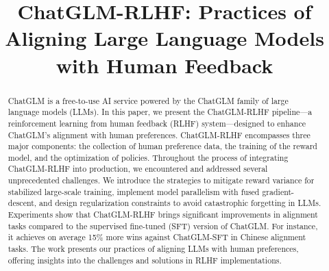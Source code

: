 \title{ChatGLM-RLHF: Practices of Aligning Large Language Models with Human Feedback}



\maketitle
\renewcommand{\thefootnote}{\fnsymbol{footnote}}
\renewcommand{\thefootnote}{\arabic{footnote}}

\begin{abstract}

ChatGLM is a free-to-use AI service powered by the ChatGLM family of large language models (LLMs). 
In this paper, we present the ChatGLM-RLHF pipeline---a reinforcement learning from human feedback (RLHF) system---designed to enhance ChatGLM's alignment with human preferences. 
ChatGLM-RLHF encompasses three major components: the collection of human preference data, the training of the reward model, and the optimization of policies. 
Throughout the process of integrating ChatGLM-RLHF into production, we encountered and addressed several unprecedented challenges. 
We introduce the strategies to mitigate reward variance for stabilized large-scale training, implement model parallelism with fused gradient-descent, and design regularization constraints to avoid catastrophic forgetting in LLMs. 
Experiments show that  ChatGLM-RLHF brings significant improvements in alignment tasks compared to the supervised fine-tuned (SFT) version of ChatGLM. 
For instance, it achieves on average 15\% more wins against ChatGLM-SFT in Chinese alignment tasks. 
The work presents our practices of aligning LLMs with human preferences, offering insights into the challenges and solutions in RLHF implementations. 

\end{abstract}

